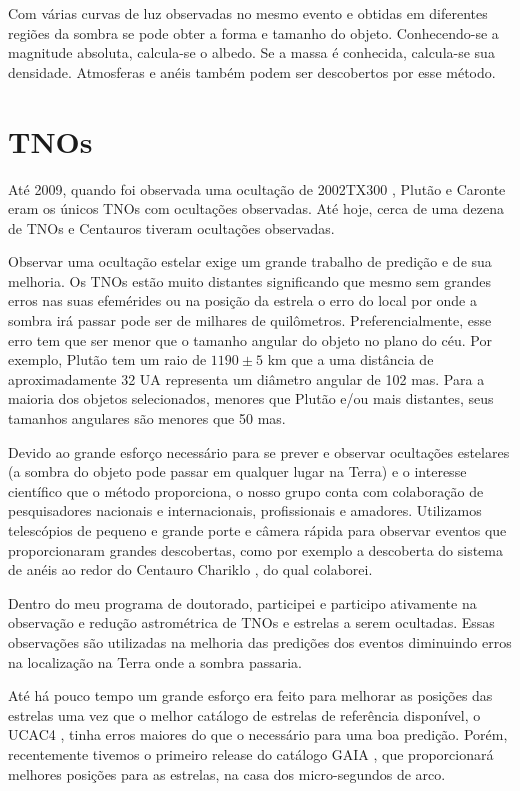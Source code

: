 \documentclass[12pt,a4paper]{report}
\begin{document}
Com várias curvas de luz observadas no mesmo evento e obtidas em diferentes regiões da sombra se pode obter a forma e tamanho do objeto. Conhecendo-se a magnitude absoluta, calcula-se o albedo. Se a massa é conhecida, calcula-se sua densidade. Atmosferas e anéis também podem ser descobertos por esse método.

\section{TNOs}
\label{Sec: TNO-occ}

Até 2009, quando foi observada uma ocultação de 2002TX300 \citep{Elliot2010}, Plutão e Caronte eram os únicos TNOs com ocultações observadas. Até hoje, cerca de uma dezena de TNOs e Centauros tiveram ocultações observadas.

Observar uma ocultação estelar exige um grande trabalho de predição e de sua melhoria. Os TNOs estão muito distantes significando que mesmo sem grandes erros nas suas efemérides ou na posição da estrela o erro do local por onde a sombra irá passar pode ser de milhares de quilômetros. Preferencialmente, esse erro tem que ser menor que o tamanho angular do objeto no plano do céu. Por exemplo, Plutão tem um raio de $1190 \pm 5$ km \cite{DiasOliveira2015} que a uma distância de aproximadamente 32 UA representa um diâmetro angular de 102 mas. Para a maioria dos objetos selecionados, menores que Plutão e/ou mais distantes, seus tamanhos angulares são menores que 50 mas.

Devido ao grande esforço necessário para se prever e observar ocultações estelares (a sombra do objeto pode passar em qualquer lugar na Terra) e o interesse científico que o método proporciona, o nosso grupo conta com colaboração de pesquisadores nacionais e internacionais, profissionais e amadores. Utilizamos telescópios de pequeno e grande porte e câmera rápida para observar eventos que proporcionaram grandes descobertas, como por exemplo a descoberta do sistema de anéis ao redor do Centauro Chariklo \citep{BragaRibas2014}, do qual colaborei.

Dentro do meu programa de doutorado, participei e participo ativamente na observação e redução astrométrica de TNOs e estrelas a serem ocultadas. Essas observações são utilizadas na melhoria das predições dos eventos diminuindo erros na localização na Terra onde a sombra passaria.

Até há pouco tempo um grande esforço era feito para melhorar as posições das estrelas uma vez que o melhor catálogo de estrelas de referência disponível, o UCAC4 \citep{Zacharias2013}, tinha erros maiores do que o necessário para uma boa predição. Porém, recentemente tivemos o primeiro release do catálogo GAIA \citep{Brown2016}, que proporcionará melhores posições para as estrelas, na casa dos micro-segundos de arco.
\end{document}
